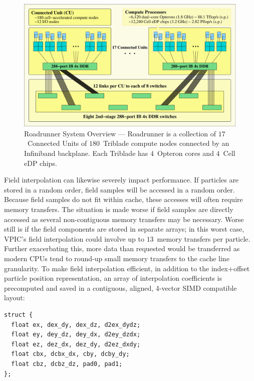 \documentclass[journal,twoside]{IEEEtran}
\begin{document}
\begin{figure}
\begin{center}
\includegraphics[width=7in]{figs/system.eps}
\caption{Roadrunner System Overview --- Roadrunner is a collection
of $17$~Connected Units of $180$~Triblade compute nodes connected by
an Infiniband backplane.  Each Triblade has $4$~Opteron cores and
$4$~Cell eDP chips.}
\label{fig:system}
\end{center}
\end{figure}

Field interpolation can likewise severely impact performance.  If
particles are stored in a random order, field samples will be accessed
in a random order.  Because field samples do not fit within cache,
these accesses will often require memory transfers.  The situation is
made worse if field samples are directly accessed as several
non-contiguous memory transfers may be necessary.  Worse still is if
the field components are stored in separate arrays; in this worst
case, VPIC's field interpolation could involve up to $13$~memory
transfers per particle.  Further exacerbating this, more data than
requested would be transferred as modern CPUs tend to round-up small
memory transfers to the cache line granularity.  To make field
interpolation efficient, in addition to the index+offset particle
position representation, an array of interpolation coefficients is
precomputed and saved in a contiguous, aligned, 4-vector SIMD
compatible layout:
\begin{verbatim}
struct {
  float ex, dex_dy, dex_dz, d2ex_dydz;
  float ey, dey_dz, dey_dx, d2ey_dzdx;
  float ez, dez_dx, dez_dy, d2ez_dxdy;
  float cbx, dcbx_dx, cby, dcby_dy;
  float cbz, dcbz_dz, pad0, pad1;
};
\end{verbatim}
\end{document}
